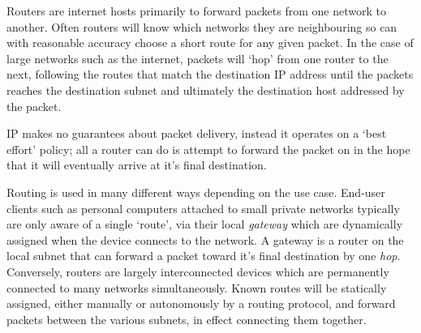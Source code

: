    Routers are internet hosts primarily to forward packets from one network to another. Often routers will know which networks they are neighbouring so can with reasonable accuracy choose a short route for any given packet. In the case of large networks such as the internet, packets will `hop' from one router to the next, following the routes that match the destination IP address until the packets reaches the destination subnet and ultimately the destination host addressed by the packet.

    IP makes no guarantees about packet delivery, instead it operates on a `best effort' policy; all a router can do is attempt to forward the packet on in the hope that it will eventually arrive at it's final destination.

    Routing is used in many different ways depending on the use case. End-user clients such as personal computers attached to small private networks typically are only aware of a single `route', via their local \textit{gateway} which are dynamically assigned when the device connects to the network. A gateway is a router on the local subnet that can forward a packet toward it's final destination by one \textit{hop}.
    Conversely, routers are largely interconnected devices which are permanently connected to many networks simultaneously. Known routes will be statically assigned, either manually or autonomously by a routing protocol, and forward packets between the various subnets, in effect connecting them together.
